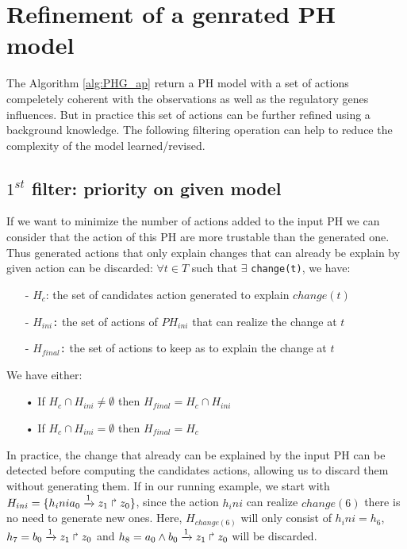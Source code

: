 \section{Refinement of a genrated PH model }
The Algorithm \ref{alg:PHG_ap} return a PH model with a set of actions compeletely coherent with the observations as well as the regulatory genes influences.
But in practice this set of actions can be further refined using a background knowledge.
The following filtering operation can help to reduce the complexity of the model learned/revised.

\subsection{$1^{st}$ filter: priority on given model}

If we want to minimize the number of actions added to the input PH we can consider that the action of this PH are more trustable than the generated one. Thus generated actions that only explain changes that can already be explain by given action can be discarded: $\forall t \in T$ such that $\exists$  \texttt{change(t)}, we have:
\begin{itemize}
\item[-] \texttt{$H_c$}: the set of candidates action generated to explain $change(t)$
\item[-] \texttt{$H_{ini}$:} the set of actions of $PH_{ini}$ that can realize the change at $t$
\item[-] \texttt{$H_{final}$:} the set of actions to keep as to explain the change at $t$
\end{itemize}
We have either:
\begin{itemize}
\item[•] If $H_c \cap H_{ini} \neq \emptyset $ then $H_{final}= H_c \cap H_{ini}$ 
\item[•] If $H_c \cap H_{ini} = \emptyset $ then $H_{final}=H_c$
\end{itemize}
In practice, the change that already can be explained by the input PH can be detected before computing the candidates actions, allowing us to discard them without generating them.
If in our running example,
we start with $H_{ini}=\{h_inia_0\xrightarrow{1} z_1 \Rsh z_0\}$,
since the action $h_ini$ can realize $change(6)$ there is no need to generate new ones.
Here, $H_{change(6)}$ will only consist of $h_ini = h_6$, $h_7=b_0\xrightarrow{1} z_1 \Rsh z_0$ and $h_8=a_0 \wedge b_0 \xrightarrow{1} z_1 \Rsh z_0 $ will be discarded. 

